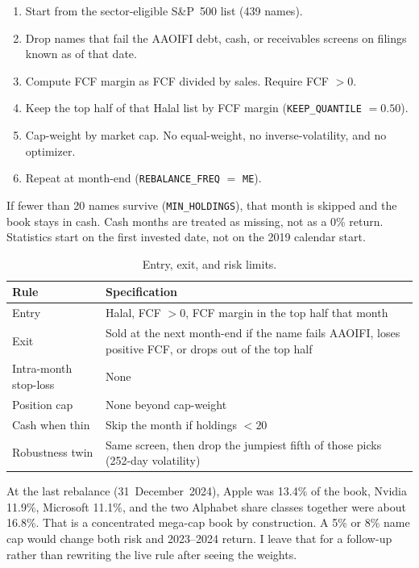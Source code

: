 \documentclass[11pt,letterpaper]{article}
\begin{document}
\begin{enumerate}
  \item Start from the sector-eligible S\&P~500 list (439 names).
  \item Drop names that fail the AAOIFI debt, cash, or receivables screens on filings known as of that date.
  \item Compute FCF margin as FCF divided by sales. Require FCF $> 0$.
  \item Keep the top half of that Halal list by FCF margin (\texttt{KEEP\_QUANTILE} $= 0.50$).
  \item Cap-weight by market cap. No equal-weight, no inverse-volatility, and no optimizer.
  \item Repeat at month-end (\texttt{REBALANCE\_FREQ} $=$ \texttt{ME}).
\end{enumerate}

If fewer than 20 names survive (\texttt{MIN\_HOLDINGS}), that month is skipped and the book stays in cash. Cash months are treated as missing, not as a 0\% return. Statistics start on the first invested date, not on the 2019 calendar start.

\begin{table}[htbp]
\centering
\caption{Entry, exit, and risk limits.}
\label{tab:rules}
\small
\begin{tabular}{lp{}}
\toprule
Rule & Specification \\
\midrule
Entry & Halal, FCF $> 0$, FCF margin in the top half that month \\
Exit & Sold at the next month-end if the name fails AAOIFI, loses positive FCF, or drops out of the top half \\
Intra-month stop-loss & None \\
Position cap & None beyond cap-weight \\
Cash when thin & Skip the month if holdings $< 20$ \\
Robustness twin & Same screen, then drop the jumpiest fifth of those picks (252-day volatility) \\
\bottomrule
\end{tabular}
\end{table}

At the last rebalance (31~December~2024), Apple was 13.4\% of the book, Nvidia 11.9\%, Microsoft 11.1\%, and the two Alphabet share classes together were about 16.8\%. That is a concentrated mega-cap book by construction. A 5\% or 8\% name cap would change both risk and 2023--2024 return. I leave that for a follow-up rather than rewriting the live rule after seeing the weights.
\end{document}
